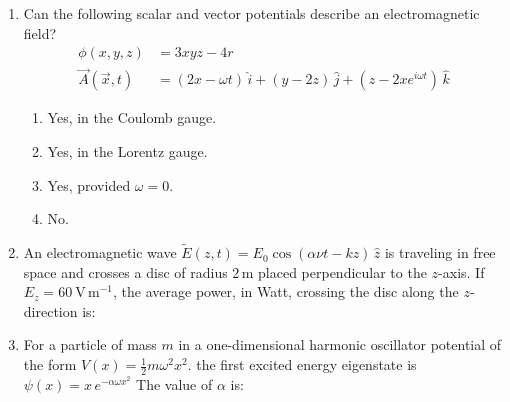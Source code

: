 \documentclass[journal,13pt,onecolumn]{IEEEtran}
\begin{document}
\begin{enumerate}[itemsep = 1em]
\hfill{}

\begin{enumerate}
\end{enumerate}

\item Can the following scalar and vector potentials describe an electromagnetic field?
\begin{align}
\phi(x,y,z) &= 3xyz - 4r \\
\vec{A}(\vec{x},t)  &= (2x - \omega t) \, \hat{i} + (y - 2z) \, \hat{j} + (z-2xe^{i\omega t}) \, \hat{k}  
\end{align}

\hfill{}

\begin{enumerate}
\item Yes, in the Coulomb gauge.
\item Yes, in the Lorentz gauge.
\item Yes, provided $\omega = 0$.
\item No.
\end{enumerate}


\item An electromagnetic wave $\tilde{E}(z,t) = E_{0} \cos(\alpha \nu t - kz) \, \hat{z}$ is traveling in free space and crosses a disc of radius $2\,\text{m}$ placed perpendicular to the $z$-axis. If $E_{z} = 60 \ \mathrm{V \, m^{-1}}$, the average power, in Watt, crossing the disc along the $z$-direction is:

\hfill{}

\begin{enumerate}
\end{enumerate}

\item For a particle of mass $m$ in a one-dimensional harmonic oscillator potential of the form  $V(x) = \frac{1}{2} m \omega^{2} x^{2}$. the first excited energy eigenstate is  $\psi(x) = x \, e^{ -\alpha \omega x^{2} }$ The value of $\alpha$ is:


\end{enumerate}
\end{document}

